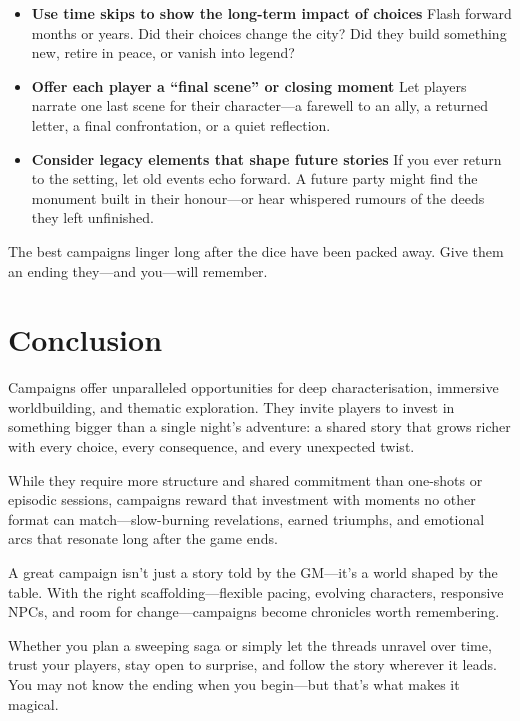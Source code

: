 \begin{itemize}
    \item \textbf{Use time skips to show the long-term impact of choices}  
    Flash forward months or years. Did their choices change the city? Did they build something new, retire in peace, or vanish into legend?

    \item \textbf{Offer each player a “final scene” or closing moment}  
    Let players narrate one last scene for their character—a farewell to an ally, a returned letter, a final confrontation, or a quiet reflection.

    \item \textbf{Consider legacy elements that shape future stories}  
    If you ever return to the setting, let old events echo forward. A future party might find the monument built in their honour—or hear whispered rumours of the deeds they left unfinished.
\end{itemize}

The best campaigns linger long after the dice have been packed away. Give them an ending they—and you—will remember.




\section{Conclusion}

Campaigns offer unparalleled opportunities for deep characterisation, immersive worldbuilding, and thematic exploration. They invite players to invest in something bigger than a single night’s adventure: a shared story that grows richer with every choice, every consequence, and every unexpected twist.

While they require more structure and shared commitment than one-shots or episodic sessions, campaigns reward that investment with moments no other format can match—slow-burning revelations, earned triumphs, and emotional arcs that resonate long after the game ends.

A great campaign isn’t just a story told by the GM—it’s a world shaped by the table. With the right scaffolding—flexible pacing, evolving characters, responsive NPCs, and room for change—\wyrd campaigns become chronicles worth remembering.

Whether you plan a sweeping saga or simply let the threads unravel over time, trust your players, stay open to surprise, and follow the story wherever it leads. You may not know the ending when you begin—but that’s what makes it magical.


